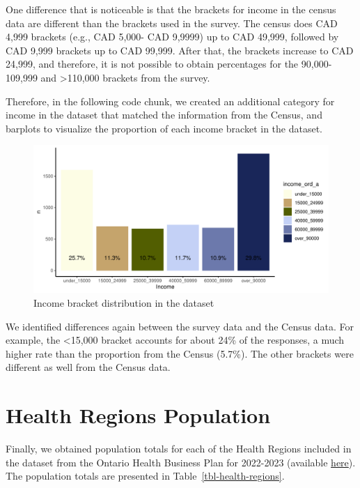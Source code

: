 \documentclass[
]{article}
\begin{document}
One difference that is noticeable is that the brackets for income in the
census data are different than the brackets used in the survey. The
census does CAD 4,999 brackets (e.g., CAD 5,000- CAD 9,9999) up to CAD
49,999, followed by CAD 9,999 brackets up to CAD 99,999. After that, the
brackets increase to CAD 24,999, and therefore, it is not possible to
obtain percentages for the 90,000-109,999 and \textgreater110,000
brackets from the survey.

Therefore, in the following code chunk, we created an additional
category for income in the dataset that matched the information from the
Census, and barplots to visualize the proportion of each income bracket
in the dataset.

\begin{figure}

{\centering \includegraphics{appendix_files/figure-pdf/income-1.pdf}

}

\caption{Income bracket distribution in the dataset}

\end{figure}

We identified differences again between the survey data and the Census
data. For example, the \textless15,000 bracket accounts for about 24\%
of the responses, a much higher rate than the proportion from the Census
(5.7\%). The other brackets were different as well from the Census data.

\hypertarget{health-regions-population}{%
\section{Health Regions Population}\label{health-regions-population}}

Finally, we obtained population totals for each of the Health Regions
included in the dataset from the Ontario Health Business Plan for
2022-2023 (available
\href{https://www.ontariohealth.ca/sites/ontariohealth/files/2022-05/OHBusinessPlan22_23.pdf}{here}).
The population totals are presented in Table~\ref{tbl-health-regions}.
\end{document}
